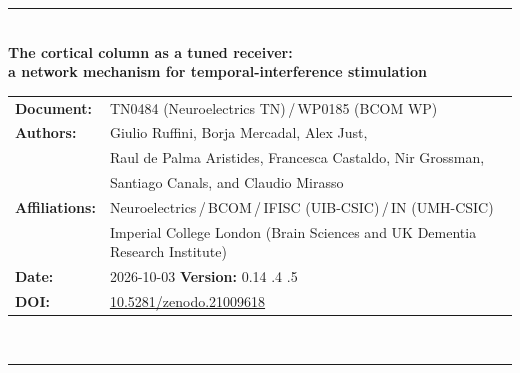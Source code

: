 \documentclass[11pt,a4paper]{article}
\newif\ifsupp
\providecommand{\DIFaddtex}[1]{{\protect\color{blue} \sf #1}} %
\providecommand{\DIFdeltex}[1]{{\protect\color{red} \scriptsize #1}} %
\providecommand{\DIFaddbegin}{} %
\providecommand{\DIFaddend}{} %
\providecommand{\DIFdelbegin}{} %
\providecommand{\DIFdelend}{} %
\providecommand{\DIFadd}[1]{\texorpdfstring{\DIFaddtex{#1}}{#1}} %
\providecommand{\DIFdel}[1]{\texorpdfstring{\DIFdeltex{#1}}{}} %
\begin{document}
\vspace{6pt}
\else
\begin{flushleft}
{\color{neblue}\rule{\textwidth}{2pt}}\\[4pt]
{\LARGE\bfseries The cortical column as a tuned receiver:\\[2pt]
a network mechanism for temporal-interference stimulation}\\[10pt]
\begin{tabular}{@{}ll@{}}
\textbf{Document:} & TN0484 (Neuroelectrics TN)\,/\,WP0185 (BCOM WP) \\
\textbf{Authors:} & Giulio Ruffini, Borja Mercadal, Alex Just,\\
& Raul de Palma Aristides, Francesca Castaldo, Nir Grossman,\\
& Santiago Canals, and Claudio Mirasso \\
\textbf{Affiliations:} & Neuroelectrics\,/\,BCOM\,/\,IFISC (UIB-CSIC)\,/\,IN (UMH-CSIC)\\
& Imperial College London (Brain Sciences and UK Dementia Research Institute) \\
\textbf{Date:} & 2026-10-03 \qquad \textbf{Version:} 0.14\DIFdelbegin \DIFdel{.4 }\DIFdelend \DIFaddbegin \DIFadd{.5 }\DIFaddend \\
\textbf{DOI:} & \href{https://doi.org/10.5281/zenodo.21009618}{10.5281/zenodo.21009618} \\
\end{tabular}\\[4pt]
{\color{neblue}\rule{\textwidth}{1pt}}
\end{flushleft}
\fi

\ifsupp
\begin{center}
{\large\bfseries Supplementary Material}\\[4pt]
\begin{minipage}{0.86\textwidth}\centering\small
Appendices and supplementary figures accompanying the article. Section, equation and
figure numbers referenced here follow the main text; supplementary figures are numbered
S1, S2, \dots
\end{minipage}
\end{center}
\vspace{8pt}
\fi

\ifsupp\else
\end{document}
